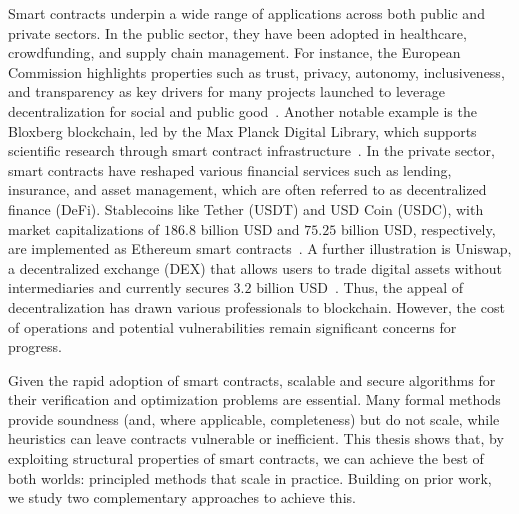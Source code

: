  Smart contracts underpin a wide range of applications across both public and private sectors. In the public sector, they have been adopted in healthcare, crowdfunding, and supply chain management. For instance, the European Commission highlights properties such as trust, privacy, autonomy, inclusiveness, and transparency as key drivers for many projects launched to leverage decentralization for social and public good~\cite{polvora2020scanning}. Another notable example is the Bloxberg blockchain, led by the Max Planck Digital Library, which supports scientific research through smart contract infrastructure~\cite{librarynoyearfirst}. In the private sector, smart contracts have reshaped various financial services such as lending, insurance, and asset management, which are often referred to as decentralized finance (DeFi). Stablecoins like Tether (USDT) and USD Coin (USDC), with market capitalizations of $186.8$ billion USD and $75.25$ billion USD, respectively, are implemented as Ethereum smart contracts~\cite{coinmarketcap2024cryptocurrency}. A further illustration is Uniswap, a decentralized exchange (DEX) that allows users to trade digital assets without intermediaries and currently secures $3.2$ billion USD~\cite{labs2024uniswap}. Thus, the appeal of decentralization has drawn various professionals to blockchain. However, the cost of operations and potential vulnerabilities remain significant concerns for progress.

Given the rapid adoption of smart contracts, scalable and secure algorithms for their verification and optimization problems are essential. Many formal methods provide soundness (and, where applicable, completeness) but do not scale, while heuristics can leave contracts vulnerable or inefficient. This thesis shows that, by exploiting structural properties of smart contracts, we can achieve the best of both worlds: principled methods that scale in practice. Building on prior work, we study two complementary approaches to achieve this.


